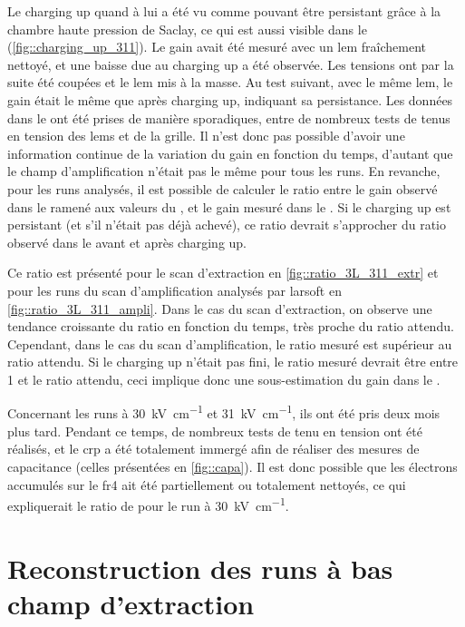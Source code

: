       Le charging up quand à lui a été vu comme pouvant être persistant grâce à la chambre haute pression de Saclay, ce qui est aussi visible dans le \TOO{} (\autoref{fig::charging_up_311}). Le gain avait été mesuré avec un \gls{lem} fraîchement nettoyé, et une baisse due au charging up a été observée. Les tensions ont par la suite été coupées et le \gls{lem} mis à la masse. Au test suivant, avec le même \gls{lem}, le gain était le même que après charging up, indiquant sa persistance. Les données dans le \TOO{} ont été prises de manière sporadiques, entre de nombreux tests de tenus en tension des \glspl{lem}  et de la grille. Il n'est donc pas possible d'avoir une information continue de la variation du gain en fonction du temps, d'autant que le champ d'amplification n'était pas le même pour tous les runs. En revanche, pour les runs analysés, il est possible de calculer le ratio entre le gain observé dans le \TOO{} ramené aux valeurs du \threeL{}, et le gain mesuré dans le \threeL{}. Si le charging up est persistant (et s'il n'était pas déjà achevé), ce ratio devrait s'approcher du ratio observé dans le \threeL{} avant et après charging up.

      Ce ratio est présenté pour le scan d'extraction en \autoref{fig::ratio_3L_311_extr} et pour les runs du scan d'amplification analysés par \gls{larsoft} en \autoref{fig::ratio_3L_311_ampli}. Dans le cas du scan d'extraction, on observe une tendance croissante du ratio en fonction du temps, très proche du ratio attendu. Cependant, dans le cas du scan d'amplification, le ratio mesuré est supérieur au ratio attendu. Si le charging up n'était pas fini, le ratio mesuré devrait être entre 1 et  le ratio attendu, ceci implique donc une sous-estimation du gain dans le \TOO{}.

      Concernant les runs à \SI{30}{\kilo\volt\per\centi\meter} et \SI{31}{\kilo\volt\per\centi\meter}, ils ont été pris deux mois plus tard. Pendant ce temps, de nombreux tests de tenu en tension ont été réalisés, et le \gls{crp} a été totalement immergé afin de réaliser des mesures de capacitance (celles présentées en \autoref{fig::capa}). Il est donc possible que les électrons accumulés sur le \gls{fr4} ait été partiellement ou totalement nettoyés, ce qui expliquerait le ratio de  pour le run à \SI{30}{\kilo\volt\per\centi\meter}.

  \section{Reconstruction des runs à bas champ d'extraction}\label{sec::rawdatasoft}

